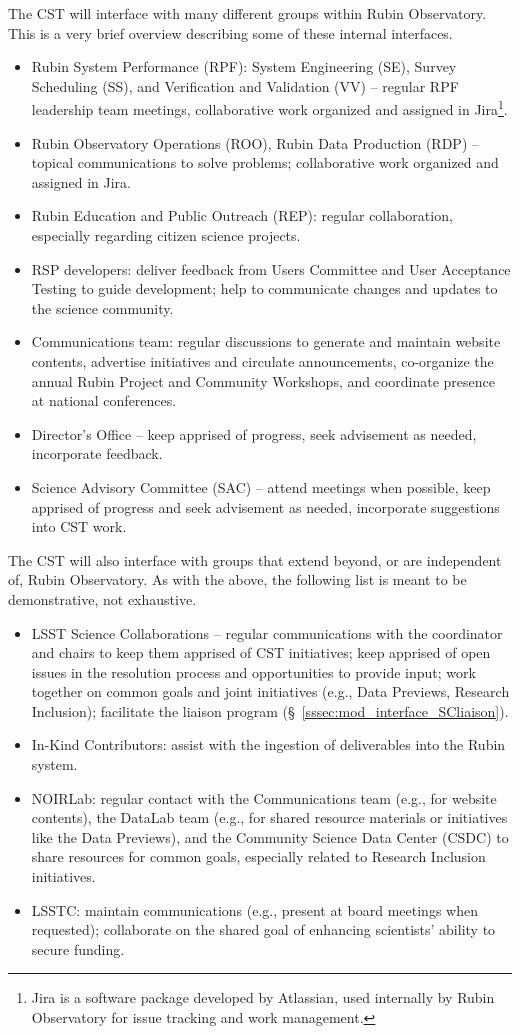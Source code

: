 \documentclass[DM,authoryear,toc]{lsstdoc}
\begin{document}
The CST will interface with many different groups within Rubin Observatory. 
This is a very brief overview describing some of these internal interfaces.
\begin{itemize}
\item Rubin System Performance (RPF): System Engineering (SE), Survey Scheduling (SS), and Verification and Validation (VV) -- regular RPF leadership team meetings, collaborative work organized and assigned in Jira\footnote{Jira is a software package developed by Atlassian, used internally by Rubin Observatory for issue tracking and work management.}.
\item Rubin Observatory Operations (ROO), Rubin Data Production (RDP) -- topical communications to solve problems; collaborative work organized and assigned in Jira.
\item Rubin Education and Public Outreach (REP): regular collaboration, especially regarding citizen science projects.
\item RSP developers: deliver feedback from Users Committee and User Acceptance Testing to guide development; help to communicate changes and updates to the science community.
\item Communications team: regular discussions to generate and maintain website contents, advertise initiatives and circulate announcements, co-organize the annual Rubin Project and Community Workshops, and coordinate presence at national conferences.
\item Director's Office -- keep apprised of progress, seek advisement as needed, incorporate feedback.
\item Science Advisory Committee (SAC) -- attend meetings when possible, keep apprised of progress and seek advisement as needed, incorporate suggestions into CST work.
\end{itemize}

The CST will also interface with groups that extend beyond, or are independent of, Rubin Observatory.
As with the above, the following list is meant to be demonstrative, not exhaustive.
\begin{itemize}
\item LSST Science Collaborations -- regular communications with the coordinator and chairs to keep them apprised of CST initiatives; keep apprised of open issues in the resolution process and opportunities to provide input; work together on common goals and joint initiatives (e.g., Data Previews, Research Inclusion); facilitate the liaison program (\S~\ref{sssec:mod_interface_SCliaison}).
\item In-Kind Contributors: assist with the ingestion of deliverables into the Rubin system.
\item NOIRLab: regular contact with the Communications team (e.g., for website contents), the DataLab team (e.g., for shared resource materials or initiatives like the Data Previews), and the Community Science Data Center (CSDC) to share resources for common goals, especially related to Research Inclusion initiatives.
\item LSSTC: maintain communications (e.g., present at board meetings when requested); collaborate on the shared goal of enhancing scientists' ability to secure funding.
\end{itemize}
\end{document}
